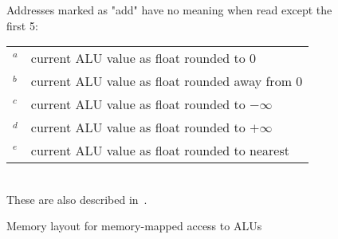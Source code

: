 \begin{figure}[ht]
\begin{center}

\label{fig:memlayout}
\caption{Memory layout for memory-mapped access to ALUs}
Addresses marked as "add" have no meaning when read except the first 5:\\
\begin{tabular}{ll}
$^a$ & current ALU value as float rounded to $0$\\
$^b$ & current ALU value as float rounded away from $0$\\
$^c$ & current ALU value as float rounded to $-\infty$\\
$^d$ & current ALU value as float rounded to $+\infty$\\
$^e$ & current ALU value as float rounded to nearest\\
\end{tabular}
\\
These are also described in~.
\end{center}
\end{figure}

